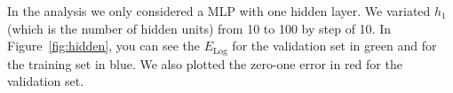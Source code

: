 \documentclass[10pt,a4paper,english]{article}
\begin{document}
In the analysis we only considered a MLP with one hidden layer. We variated $h_1$ (which is the number of hidden units) from 10 to 100 by step of 10.
In Figure~\ref{fig:hidden}, you can see the $E_{\mathrm{Log}}$ for the validation set in green and for the training set in blue. We also plotted the
zero-one error in red for the validation set.
\begin{figure}[!h]
    \centering
    \\

\end{figure}
\end{document}

